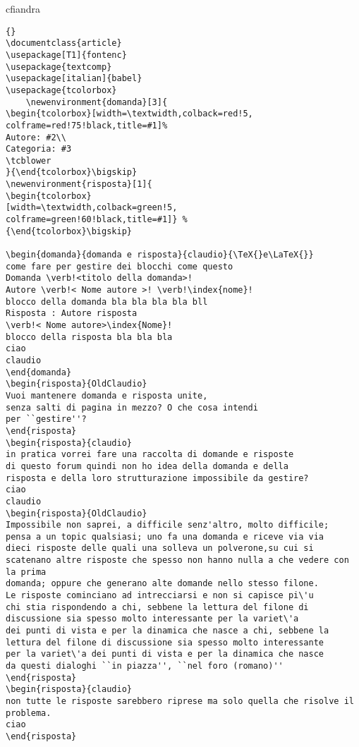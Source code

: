 \begin{risposta}{cfiandra}
	\begin{lstlisting}{}
\documentclass{article}
\usepackage[T1]{fontenc}
\usepackage{textcomp}
\usepackage[italian]{babel}
\usepackage{tcolorbox}
	\newenvironment{domanda}[3]{
\begin{tcolorbox}[width=\textwidth,colback=red!5,
colframe=red!75!black,title=#1]%
Autore: #2\\
Categoria: #3
\tcblower
}{\end{tcolorbox}\bigskip}
\newenvironment{risposta}[1]{
\begin{tcolorbox}
[width=\textwidth,colback=green!5,
colframe=green!60!black,title=#1]} %
{\end{tcolorbox}\bigskip} 

\begin{domanda}{domanda e risposta}{claudio}{\TeX{}e\LaTeX{}}
come fare per gestire dei blocchi come questo
Domanda \verb!<titolo della domanda>! 
Autore \verb!< Nome autore >! \verb!\index{nome}!
blocco della domanda bla bla bla bla bll
Risposta : Autore risposta 
\verb!< Nome autore>\index{Nome}!
blocco della risposta bla bla bla
ciao
claudio
\end{domanda}
\begin{risposta}{OldClaudio}
Vuoi mantenere domanda e risposta unite, 
senza salti di pagina in mezzo? O che cosa intendi 
per ``gestire''?
\end{risposta}
\begin{risposta}{claudio}
in pratica vorrei fare una raccolta di domande e risposte 
di questo forum quindi non ho idea della domanda e della 
risposta e della loro strutturazione impossibile da gestire?
ciao
claudio
\begin{risposta}{OldClaudio}
Impossibile non saprei, a difficile senz'altro, molto difficile; 
pensa a un topic qualsiasi; uno fa una domanda e riceve via via 
dieci risposte delle quali una solleva un polverone,su cui si 
scatenano altre risposte che spesso non hanno nulla a che vedere con la prima
domanda; oppure che generano alte domande nello stesso filone. 
Le risposte cominciano ad intrecciarsi e non si capisce pi\'u 
chi stia rispondendo a chi, sebbene la lettura del filone di 
discussione sia spesso molto interessante per la variet\'a  
dei punti di vista e per la dinamica che nasce a chi, sebbene la 
lettura del filone di discussione sia spesso molto interessante 
per la variet\'a dei punti di vista e per la dinamica che nasce	
da questi dialoghi ``in piazza'', ``nel foro (romano)''
\end{risposta}
\begin{risposta}{claudio}
non tutte le risposte sarebbero riprese ma solo quella che risolve il problema.
ciao 
\end{risposta}

\end{lstlisting}

\end{risposta}